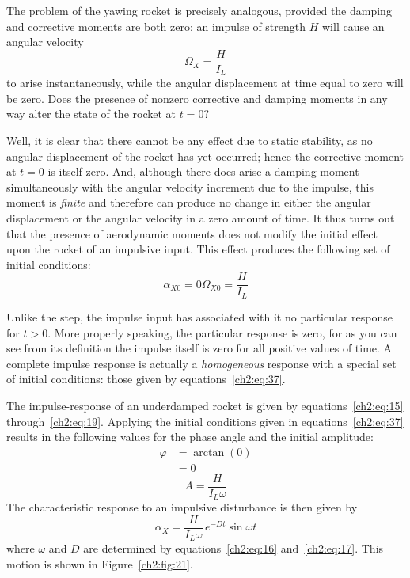 The problem of the yawing rocket is precisely analogous, provided the damping
and corrective moments are both zero: an impulse of strength $H$ will cause an
angular velocity
\begin{equation*}
\Omega_X = \frac{H}{I_L}
\end{equation*}
to arise instantaneously, while the angular displacement at time equal to zero
will be zero. Does the presence of nonzero corrective and damping moments in
any way alter the state of the rocket at $t = 0$?

Well, it is clear that there cannot be any effect due to static stability, as
no angular displacement of the rocket has yet occurred; hence the corrective
moment at $t = 0$ is itself zero. And, although there does arise a damping
moment simultaneously with the angular velocity increment due to the impulse,
this moment is \emph{finite} and therefore can produce no change in either the
angular displacement or the angular velocity in a zero amount of time. It thus
turns out that the presence of aerodynamic moments does not modify the initial
effect upon the rocket of an impulsive input. This effect produces the
following set of initial conditions:
\begin{subequations}\label{ch2:eq:37}
\begin{equation}\label{ch2:eq:37a}
\alpha_{X0} = 0
\end{equation}
\begin{equation}\label{ch2:eq:37b}
\Omega_{X0} = \frac{H}{I_L}
\end{equation}
\end{subequations}

Unlike the step, the impulse input has associated with it no particular
response for $t > 0$. More properly speaking, the particular response is zero,
for as you can see from its definition the impulse itself is zero for all
positive values of time. A complete impulse response is actually a
\emph{homogeneous} response with a special set of initial conditions: those
given by equations~\eqref{ch2:eq:37}.

The impulse-response of an underdamped rocket is given by
equations~\eqref{ch2:eq:15} through~\eqref{ch2:eq:19}. Applying the initial
conditions given in equations~\eqref{ch2:eq:37} results in the following values
for the phase angle and the initial amplitude:
\begin{align*}
\varphi &= \arctan(0)\\
        &= 0
\end{align*}
\begin{equation*}
A = \frac{H}{I_L\omega}
\end{equation*}
The characteristic response to an impulsive disturbance is then given by
\begin{equation}\label{ch2:eq:38}
\alpha_X = \frac{H}{I_L\omega}\, e^{-Dt}\sin\omega t
\end{equation}
where $\omega$ and $D$ are determined by equations~\eqref{ch2:eq:16}
and~\eqref{ch2:eq:17}. This motion is shown in Figure~\ref{ch2:fig:21}.

